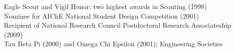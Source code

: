 Eagle Scout and Vigil Honor; two highest awards in Scouting (1998)\\
Nominee for AIChE National Student Design Competition (2001)\\
Recipient of National Research Council Postdoctoral Research Associateship (2009)\\
Tau Beta Pi (2000) and Omega Chi Epsilon (2001); Engineering Societies

